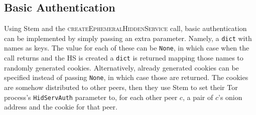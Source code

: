 \documentclass[diss.tex]{subfiles}
\begin{document}
\subsection{Basic Authentication}

Using Stem and the \textsc{createEphemeralHiddenService} call, basic authentication can be implemented by simply passing an extra parameter. Namely, a \texttt{dict} with names as keys. The value for each of these can be \texttt{None}, in which case when the call returns and the HS is created a \texttt{dict} is returned mapping those names to randomly generated cookies. Alternatively, already generated cookies can be specified instead of passing \texttt{None}, in which case those are returned. The cookies are somehow distributed to other peers, then they use Stem to set their Tor process's \texttt{HidServAuth} parameter to, for each other peer $c$, a pair of $c$'s onion address and the cookie for that peer.
\end{document}
